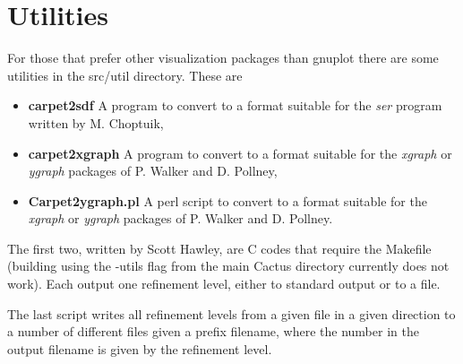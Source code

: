 \section{Utilities}
\label{sec:utils}

For those that prefer other visualization packages than gnuplot there
are some utilities in the src/util directory. These are
\begin{itemize}
\item {\bf carpet2sdf} A program to convert to a format suitable for
  the {\it ser} program written by M. Choptuik,
\item {\bf carpet2xgraph} A program to convert to a format suitable
  for the {\it xgraph} or {\it ygraph} packages of P. Walker and D.
  Pollney,
\item {\bf Carpet2ygraph.pl} A perl script to convert to a format
  suitable for the {\it xgraph} or {\it ygraph} packages of P. Walker
  and D. Pollney.
\end{itemize}
The first two, written by Scott Hawley, are C codes that require the
Makefile (building using the -utils flag from the main Cactus
directory currently does not work). Each output one refinement level,
either to standard output or to a file.

The last script writes all refinement levels from a given file in a
given direction to a number of different files given a prefix
filename, where the number in the output filename is given by the
refinement level.


\begin{thebibliography}{9}

\end{thebibliography}



